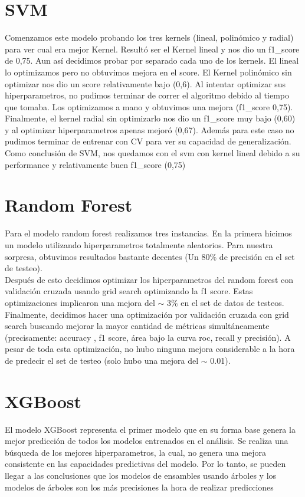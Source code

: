 \documentclass{article}
\begin{document}
\section*{SVM} 

Comenzamos este modelo probando los tres kernels (lineal, polinómico y radial) para ver cual era mejor Kernel. Resultó ser el Kernel lineal y nos dio un f1\_score de 0,75. Aun así decidimos probar por separado cada uno de los kernels. El lineal lo optimizamos pero no obtuvimos mejora en el score. 
El Kernel polinómico sin optimizar nos dio un score relativamente bajo (0,6). Al intentar optimizar sus hiperparametros, no pudimos terminar de correr el algoritmo debido al tiempo que tomaba. Los optimizamos a mano y obtuvimos una mejora (f1\_score 0,75).
Finalmente, el kernel radial sin optimizarlo nos dio un f1\_score muy bajo (0,60) y al optimizar hiperparametros apenas mejoró (0,67). Además para este caso no pudimos terminar de entrenar con CV para ver su capacidad de generalización.
Como conclusión de SVM, nos quedamos con el svm con kernel lineal debido a su performance y relativamente buen f1\_score (0,75)

\section*{Random Forest} 

Para el modelo random forest realizamos tres instancias. En la primera hicimos un modelo utilizando hiperparametros totalmente aleatorios. Para nuestra sorpresa, obtuvimos resultados bastante decentes (Un 80\% de precisión en el set de testeo).\\
Después de esto decidimos optimizar los hiperparametros del random forest con validación cruzada usando grid search optimizando la f1 score.  Estas optimizaciones implicaron una mejora del $\sim$ 3\% en el set de datos de testeos. Finalmente, decidimos hacer una optimización por validación cruzada con grid search buscando mejorar la mayor cantidad de métricas simultáneamente (precisamente: accuracy , f1 score, área bajo la curva roc, recall y precisión). A pesar de toda esta optimización, no hubo ninguna mejora considerable a la hora de predecir el set de testeo (solo hubo una mejora del $\sim$ 0.01). 

\section*{XGBoost} 

El modelo XGBoost representa el primer modelo que en su forma base genera la mejor predicción de todos los modelos entrenados en el análisis. Se realiza una búsqueda de los mejores hiperparametros, la cual, no genera una mejora consistente en las capacidades predictivas del modelo. Por lo tanto, se pueden llegar a las conclusiones que los modelos de ensambles usando árboles y los modelos de árboles son los más precisiones  la hora de realizar predicciones
\end{document}
